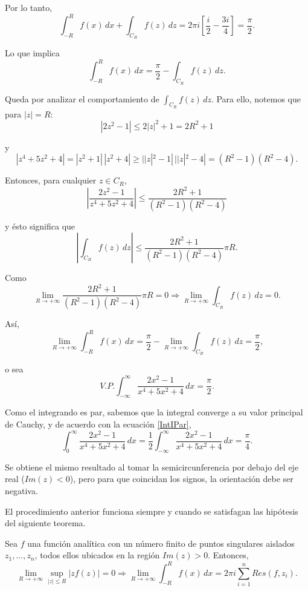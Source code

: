 \begin{ejemplo}
Por lo tanto,
$$\int_{-R}^R f(x) \,dx + \int_{C_R}f(z)\,dz = 2\pi i \left[\frac{i}{2} - \frac{3i}{4}\right] = \frac{\pi}{2}.$$

Lo que implica
$$\int_{-R}^R f(x) \,dx = \frac{\pi}{2} - \int_{C_R}f(z)\,dz.$$

Queda por analizar el comportamiento de $\int_{C_R} f(z) \,dz$. Para ello, notemos que para $|z| = R$:
$$|2z^2-1| \leq 2|z|^2 +1 = 2R^2+1$$

y
$$|z^4+5z^2+4| = |z^2+1|\,|z^2+4| \geq ||z|^2 - 1|\,||z|^2-4| = (R^2-1)(R^2-4).$$

Entonces, para cualquier $z \in C_R$,
$$\left| \frac{2z^2-1}{z^4+5z^2+4} \right| \leq \frac{2R^2+1}{(R^2-1)(R^2-4)}$$

y ésto significa que 
$$\left|\int_{C_R} f(z) \,dz \right| \leq\frac{2R^2+1}{(R^2-1)(R^2-4)} \pi R.$$

Como
$$\lim_{R \to + \infty} \frac{2R^2+1}{(R^2-1)(R^2-4)} \pi R = 0 \Rightarrow \lim_{R \to + \infty} \int_{C_R} f(z) \,dz = 0.$$

Así,
$$\lim_{R \to + \infty} \int_{-R}^R f(x) \,dx = \frac{\pi}{2} - \lim_{R\to + \infty} \int_{C_R} f(z) \,dz = \frac{\pi}{2},$$

o sea
$$V.P. \int_{-\infty}^{\infty}  \frac{2x^2-1}{x^4+5x^2+4} \,dx = \frac{\pi}{2}.$$

Como el integrando es par, sabemos que la integral converge a su valor principal de Cauchy, y de acuerdo con la ecuación \eqref{IntIPar},
$$\int_0^{\infty} \frac{2x^2-1}{x^4+5x^2+4} \,dx = \frac{1}{2}  \int_{-\infty}^{\infty}  \frac{2x^2-1}{x^4+5x^2+4} \,dx = \frac{\pi}{4}.$$

Se obtiene el mismo resultado al tomar la semicircunferencia por debajo del eje real ($Im(z) < 0$), pero para que coincidan los signos, la orientación debe ser negativa.
\end{ejemplo}

El procedimiento anterior funciona siempre y cuando se satisfagan las hipótesis del siguiente teorema.

\begin{teorema}
Sea $f$ una función analítica con un número finito de puntos singulares aislados $z_1, \dots, z_n$, todos ellos ubicados en la región $Im (z) > 0$. Entonces,
$$\lim_{R\to + \infty} \sup_{|z| \leq R} |zf(z)| = 0 \Rightarrow \lim_{R\to + \infty} \int_{-R}^R f(x) \,dx = 2\pi i \sum_{i=1}^n Res(f,z_i).$$
\end{teorema}

